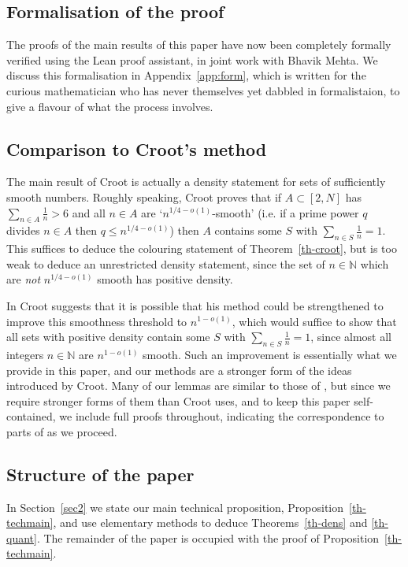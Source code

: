 \documentclass[12pt]{amsart}
\newcommand{\bbn}{\mathbb{N}}
\begin{document}
 \subsection*{Formalisation of the proof} The proofs of the main results of this paper have now been completely formally verified using the Lean proof assistant, in joint work with Bhavik Mehta. We discuss this formalisation in Appendix~\ref{app:form}, which is written for the curious mathematician who has never themselves yet dabbled in formalistaion, to give a flavour of what the process involves.

 
 \subsection*{Comparison to Croot's method}
The main result of Croot \cite{Cr2003} is actually a density statement for sets of sufficiently smooth numbers. Roughly speaking, Croot proves that if $A\subset [2,N]$ has $\sum_{n\in A}\frac{1}{n}> 6$ and all $n\in A$ are `$n^{1/4-o(1)}$-smooth' (i.e. if a prime power $q$ divides $n\in A$ then $q\leq n^{1/4-o(1)}$) then $A$ contains some $S$ with $\sum_{n\in S}\frac{1}{n}=1$. This suffices to deduce the colouring statement of Theorem~\ref{th-croot}, but is too weak to deduce an unrestricted density statement, since the set of $n\in \bbn$ which are \emph{not} $n^{1/4-o(1)}$ smooth has positive density. 

In \cite{Crootphd} Croot suggests that it is possible that his method could be strengthened to improve this smoothness threshold to $n^{1-o(1)}$, which would suffice to show that all sets with positive density contain some $S$ with $\sum_{n\in S}\frac{1}{n}=1$, since almost all integers $n\in\bbn$ are $n^{1-o(1)}$ smooth. Such an improvement is essentially what we provide in this paper, and our methods are a stronger form of the ideas introduced by Croot. Many of our lemmas are similar to those of \cite{Cr2003}, but since we require stronger forms of them than Croot uses, and to keep this paper self-contained, we include full proofs throughout, indicating the correspondence to parts of \cite{Cr2003} as we proceed.

\subsection*{Structure of the paper}
In Section~\ref{sec2} we state our main technical proposition, Proposition~\ref{th-techmain}, and use elementary methods to deduce Theorems~\ref{th-dens} and \ref{th-quant}. The remainder of the paper is occupied with the proof of Proposition~\ref{th-techmain}.
\end{document}
